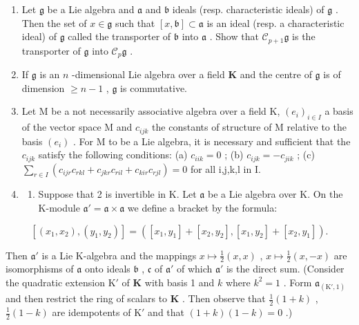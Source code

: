 
\begin{enumerate}
\def\labelenumi{\arabic{enumi}.}
\item
  Let \(\mathfrak{g}\) be a Lie algebra and \(\mathfrak{a}\) and \(\mathfrak{b}\) ideals (resp. characteristic ideals) of \(\mathfrak{g}\) . Then the set of \(x \in \mathfrak{g}\) such that \([x, \mathfrak{b}] \subset \mathfrak{a}\) is an ideal (resp. a characteristic ideal) of \(\mathfrak{g}\) called the transporter of \(\mathfrak{b}\) into \(\mathfrak{a}\) . Show that \(\mathcal{C}_{p+1}\mathfrak{g}\) is the transporter of \(\mathfrak{g}\) into \(\mathcal{C}_p\mathfrak{g}\) .
\item
  If \(\mathfrak{g}\) is an \(n\) -dimensional Lie algebra over a field \(\mathbf{K}\) and the centre of \(\mathfrak{g}\) is of dimension \(\geqslant n - 1\) , \(\mathfrak{g}\) is commutative.
\item
  Let M be a not necessarily associative algebra over a field K, \((e_{i})_{i\in I}\) a basis of the vector space M and \(c_{ijk}\) the constants of structure of M relative to the basis \((e_{i})\) . For M to be a Lie algebra, it is necessary and sufficient that the \(c_{ijk}\) satisfy the following conditions: (a) \(c_{iik}=0\) ; (b) \(c_{ijk}=-c_{jik}\) ; (c) \(\sum_{r\in I}(c_{ijr}c_{rkl}+c_{jkr}c_{ril}+c_{kir}c_{rjl})=0\) for all i,j,k,l in I.
\item
  \begin{enumerate}
  \def\labelenumii{(\alph{enumii})}
  \tightlist
  \item
    Suppose that 2 is invertible in K. Let \(\mathfrak{a}\) be a Lie algebra over K. On the K-module \(\mathfrak{a}' = \mathfrak{a} \times \mathfrak{a}\) we define a bracket by the formula:
  \end{enumerate}
\end{enumerate}

\[
[ (x _ {1}, x _ {2}), (y _ {1}, y _ {2}) ] = ([ x _ {1}, y _ {1} ] + [ x _ {2}, y _ {2} ], [ x _ {1}, y _ {2} ] + [ x _ {2}, y _ {1} ]).
\]

Then \(\mathfrak{a}'\) is a Lie K-algebra and the mappings \(x\mapsto \frac{1}{2} (x,x)\) , \(x\mapsto \frac{1}{2} (x, - x)\) are isomorphisms of \(\mathfrak{a}\) onto ideals \(\mathfrak{b}\) , \(\mathfrak{c}\) of \(\mathfrak{a}'\) of which \(\mathfrak{a}'\) is the direct sum. (Consider the quadratic extension \(\mathrm{K}'\) of \(\mathbf{K}\) with basis 1 and \(k\) where \(k^2 = 1\) . Form \(\mathfrak{a}_{(\mathrm{K}',1)}\) and then restrict the ring of scalars to \(\mathbf{K}\) . Then observe that \(\frac{1}{2} (1 + k)\) , \(\frac{1}{2}(1 - k)\) are idempotents of \(\mathrm{K}'\) and that \((1 + k)(1 - k) = 0\) .)

